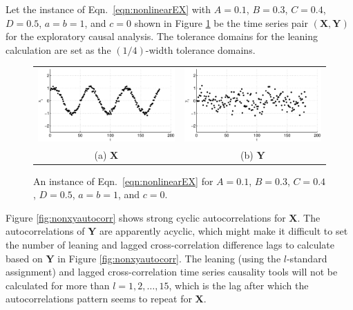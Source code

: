 Let the instance of Eqn.\ \ref{eqn:nonlinearEX} with $A=0.1$, $B=0.3$, $C=0.4$, $D=0.5$, $a=b=1$, and $c=0$ shown in Figure \ref{fig:nonxyplot} be the time series pair $(\mathbf{X},\mathbf{Y})$ for the exploratory causal analysis.  The tolerance domains for the leaning calculation are set as the $(1/4)$-width tolerance domains.
\begin{figure}[ht]
\begin{tabular}{cc}
\includegraphics[scale=0.5]{NonlinearResponseExample_X.eps} & \includegraphics[scale=0.5]{NonlinearResponseExample_Y.eps} \\
(a) $\mathbf{X}$ & (b) $\mathbf{Y}$
\end{tabular}
\caption{An instance of Eqn.\ \ref{eqn:nonlinearEX} for $A=0.1$, $B=0.3$, $C=0.4$, $D=0.5$, $a=b=1$, and $c=0$.}
\label{fig:nonxyplot}
\end{figure}

Figure \ref{fig:nonxyautocorr} shows strong cyclic autocorrelations for $\mathbf{X}$.  The autocorrelations of $\mathbf{Y}$ are apparently acyclic, which might make it difficult to set the number of leaning and lagged cross-correlation difference lags to calculate based on $\mathbf{Y}$ in Figure \ref{fig:nonxyautocorr}.  The leaning (using the $l$-standard assignment) and lagged cross-correlation time series causality tools will not be calculated for more than $l=1,2,\ldots,15$, which is the lag after which the autocorrelations pattern seems to repeat for $\mathbf{X}$.  

